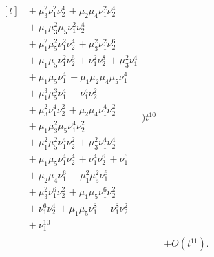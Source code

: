 \documentclass[10pt]{article}
\begin{document}
\[\begin{aligned}
\begin{aligned}[t]
  &{}+\mu_3^{2}\nu_1^{2}\nu_2^{4}\,+\mu_2\mu_4\nu_1^{2}\nu_2^{4} \\
  &{}+\mu_1\mu_3^{2}\mu_5\nu_1^{2}\nu_2^{4} \\
  &{}+\mu_1^{2}\mu_5^{2}\nu_1^{2}\nu_2^{4}\,+\mu_3^{2}\nu_1^{2}\nu_2^{6} \\
  &{}+\mu_1\mu_5\nu_1^{2}\nu_2^{6}\,+\nu_1^{2}\nu_2^{8}\,+\mu_3^{2}\nu_1^{4} \\
  &{}+\mu_1\mu_5\nu_1^{4}\,+\mu_1\mu_2\mu_4\mu_5\nu_1^{4} \\
  &{}+\mu_1^{3}\mu_5^{3}\nu_1^{4}\,+\nu_1^{4}\nu_2^{2} \\
  &{}+\mu_3^{2}\nu_1^{4}\nu_2^{2}\,+\mu_2\mu_4\nu_1^{4}\nu_2^{2} \\
  &{}+\mu_1\mu_3^{2}\mu_5\nu_1^{4}\nu_2^{2} \\
  &{}+\mu_1^{2}\mu_5^{2}\nu_1^{4}\nu_2^{2}\,+\mu_3^{2}\nu_1^{4}\nu_2^{4} \\
  &{}+\mu_1\mu_5\nu_1^{4}\nu_2^{4}\,+\nu_1^{4}\nu_2^{6}\,+\nu_1^{6} \\
  &{}+\mu_2\mu_4\nu_1^{6}\,+\mu_1^{2}\mu_5^{2}\nu_1^{6} \\
  &{}+\mu_3^{2}\nu_1^{6}\nu_2^{2}\,+\mu_1\mu_5\nu_1^{6}\nu_2^{2} \\
  &{}+\nu_1^{6}\nu_2^{4}\,+\mu_1\mu_5\nu_1^{8}\,+\nu_1^{8}\nu_2^{2} \\
  &{}+\nu_1^{10}\end{aligned}\Bigr)t^{10} \\
  &+ O(t^{11}).
\end{aligned}
\]
\end{document}
